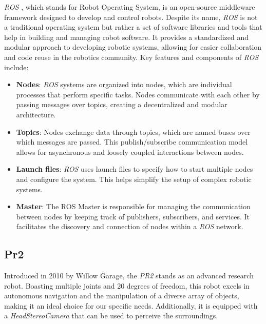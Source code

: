 \textit{ROS} \cite{ros}, which stands for Robot Operating System, is an open-source middleware framework designed to develop and control robots. Despite its name, \textit{ROS} \cite{ros} is not a traditional operating system but rather a set of software libraries and tools that help in building and managing robot software. It provides a standardized and modular approach to developing robotic systems, allowing for easier collaboration and code reuse in the robotics community.
Key features and components of \textit{ROS} \cite{ros} include:
\begin{itemize}
	\item \textbf{Nodes}: \textit{ROS} \cite{ros} systems are organized into nodes, which are individual processes that perform specific tasks. Nodes communicate with each other by passing messages over topics, creating a decentralized and modular architecture.
	\item \textbf{Topics}: Nodes exchange data through topics, which are named buses over which messages are passed. This publish/subscribe communication model allows for asynchronous and loosely coupled interactions between nodes.
	\item \textbf{Launch files}: \textit{ROS} \cite{ros} uses launch files to specify how to start multiple nodes and configure the system. This helps simplify the setup of complex robotic systems.
	\item \textbf{Master}: The ROS Master is responsible for managing the communication between nodes by keeping track of publishers, subscribers, and services. It facilitates the discovery and connection of nodes within a \textit{ROS} \cite{ros} network.
\end{itemize}

\subsection{Pr2}
\label{sec:pr2}
Introduced in 2010 by Willow Garage, the \textit{PR2} \cite{pr2} stands as an advanced research robot. Boasting multiple joints and 20 degrees of freedom, this robot excels in autonomous navigation and the manipulation of a diverse array of objects, making it an ideal choice for our specific needs. Additionally, it is equipped with a \textit{HeadStereoCamera} that can be used to perceive the surroundings.

